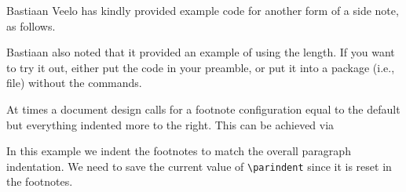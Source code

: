\begin{sniplet}\label{snip:veelo}
  Bastiaan Veelo has kindly provided example code 
  for another form of a side note, as follows.
\begin{lcode}
\makeatletter
   \ifdraftdoc
     \newlength{\draftnotewidth}
     \newlength{\draftnotesignwidth}
     \newcommand{\draftnote}[1]{\@bsphack%
       {%
         \strictpagecheck%
         \checkoddpage%
         \setlength{\draftnotewidth}{\foremargin}%
         \addtolength{\draftnotewidth}{\trimedge}%
         \addtolength{\draftnotewidth}{-3\marginparsep}%
         \ifoddpage
           \setlength{\marginparwidth}{\draftnotewidth}%
           \marginpar{\flushleft\textbf{\textit{\HUGE !\ }}\small #1}%
         \else
           \settowidth{\draftnotesignwidth}{\textbf{\textit{\HUGE\ !}}}%
           \addtolength{\draftnotewidth}{-\draftnotesignwidth}%
           \marginpar{\raggedleft\makebox[0pt][r]{%
               \parbox[t]{\draftnotewidth}{%
                 \raggedleft\small\hspace{0pt}#1%
               }}\textbf{\textit{\HUGE\ !}}%
           }%
         \fi
       }\@esphack}
   \else
     \newcommand{\draftnote}[1]{\@bsphack\@esphack}
   \fi
\makeatother
\end{lcode}
Bastiaan also noted that it provided an example of using the
\lnc{\foremargin} length.  If you want to try it out, either put the
code in your preamble, or put it into a package (i.e., 
file) without the  commands.
\end{sniplet}


\begin{sniplet}

At times a document design calls for a footnote configuration equal to
the default but everything indented more to the right. This can be
achieved via
\begin{lcode}
  \newlength\myextrafootnoteindent
  \setlength\myextrafootnoteindent{\parindent}
  \renewcommand\makefootmarkhook{%
    \addtolength{\leftskip}{\myextrafootnoteindent}} 
\end{lcode}
In this example we indent the footnotes to match the overall paragraph
indentation. We need to save the current value of \verb?\parindent?
since it is reset in the footnotes.
  
\end{sniplet}


